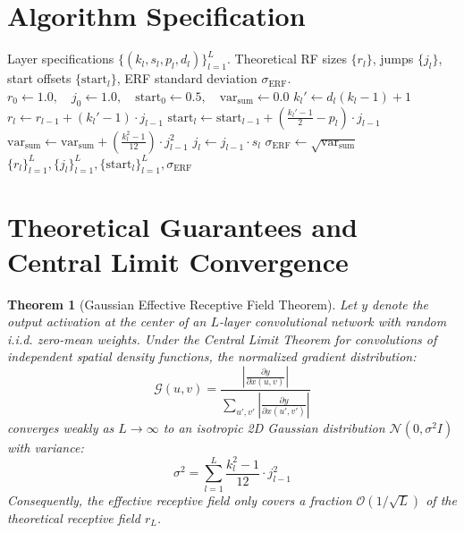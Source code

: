 \documentclass[11pt,a4paper]{article}
\newtheorem{theorem}{Theorem}
\theoremstyle{definition}
\begin{document}
\section{Algorithm Specification}

\begin{algorithm}[H]
\caption{Receptive Field and Spatial Coordinate Profiling}
\label{alg:rf_analysis}
\begin{algorithmic}[1]
\Require Layer specifications $\{(k_l, s_l, p_l, d_l)\}_{l=1}^L$.
\Ensure Theoretical RF sizes $\{r_l\}$, jumps $\{j_l\}$, start offsets $\{\text{start}_l\}$, ERF standard deviation $\sigma_{\text{ERF}}$.
\State $r_0 \gets 1.0, \quad j_0 \gets 1.0, \quad \text{start}_0 \gets 0.5, \quad \text{var}_{\text{sum}} \gets 0.0$
    \State $k_l' \gets d_l (k_l - 1) + 1$
    \State $r_l \gets r_{l-1} + (k_l' - 1) \cdot j_{l-1}$
    \State $\text{start}_l \gets \text{start}_{l-1} + \left( \frac{k_l' - 1}{2} - p_l \right) \cdot j_{l-1}$
    \State $\text{var}_{\text{sum}} \gets \text{var}_{\text{sum}} + \left( \frac{k_l^2 - 1}{12} \right) \cdot j_{l-1}^2$
    \State $j_l \gets j_{l-1} \cdot s_l$
\EndFor
\State $\sigma_{\text{ERF}} \gets \sqrt{\text{var}_{\text{sum}}}$
\State \Return $\{r_l\}_{l=1}^L, \{j_l\}_{l=1}^L, \{\text{start}_l\}_{l=1}^L, \sigma_{\text{ERF}}$
\end{algorithmic}
\end{algorithm}

\section{Theoretical Guarantees and Central Limit Convergence}

\begin{theorem}[Gaussian Effective Receptive Field Theorem]
\label{thm:erf_gaussian}
Let $y$ denote the output activation at the center of an $L$-layer convolutional network with random i.i.d. zero-mean weights. Under the Central Limit Theorem for convolutions of independent spatial density functions, the normalized gradient distribution:
\begin{equation}
\mathcal{G}(u, v) = \frac{\left| \frac{\partial y}{\partial x(u, v)} \right|}{\sum_{u', v'} \left| \frac{\partial y}{\partial x(u', v')} \right|}
\end{equation}
converges weakly as $L \to \infty$ to an isotropic 2D Gaussian distribution $\mathcal{N}(0, \sigma^2 I)$ with variance:
\begin{equation}
\sigma^2 = \sum_{l=1}^L \frac{k_l^2 - 1}{12} \cdot j_{l-1}^2
\end{equation}
Consequently, the effective receptive field only covers a fraction $\mathcal{O}(1/\sqrt{L})$ of the theoretical receptive field $r_L$.
\end{theorem}
\end{document}
